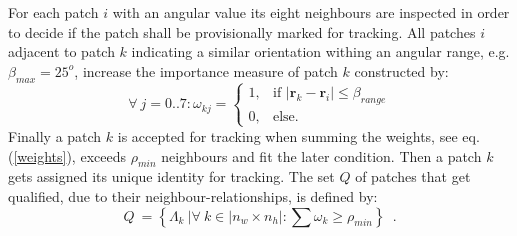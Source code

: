 %
For each patch $i$ with an angular value its eight neighbours are inspected in order to decide if the patch shall be provisionally marked for tracking. All patches $i$ adjacent to patch $k$ indicating a similar orientation withing an angular range, e.g. $\beta_{max} = 25^{o}$, increase the importance measure of patch $k$ constructed by: %
\begin{equation}
\label{weights}
	\forall\ j=0..7: \omega_{kj} = 
	\begin{cases}
		1, & \mbox{if } \vert \mathbf{r}_k  - \mathbf{r}_i \vert \leq \beta_{range} \\ 
		0, & \mbox{else. } 
	\end{cases}
\end{equation}
Finally a patch $k$ is accepted for tracking when summing the weights, see eq. (\ref{weights}), exceeds $\rho_{min}$ neighbours and fit the later condition. Then a patch $k$ gets assigned its unique identity for tracking. 
The set $Q$ of patches that get qualified, due to their neighbour-relationships, is defined by:
\begin{equation}
\label{qualify}
	Q\ = \left\lbrace  \Lambda_k\ \vert \forall\ k \in \vert n_{w} \times n_{h} \vert: \sum{\omega_k \geq \rho_{min}} \right\rbrace \enspace .
\end{equation}
